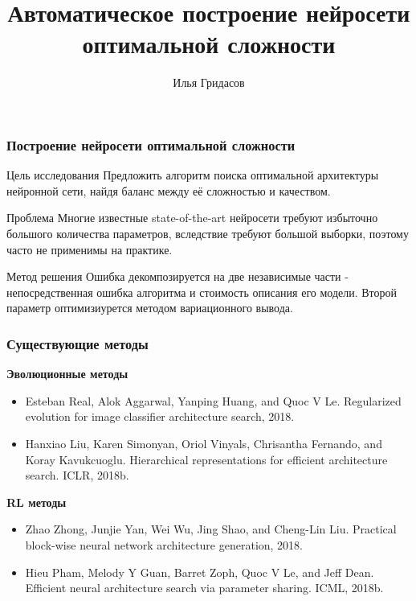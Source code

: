 \documentclass{beamer}
\title[\hbox to 56mm{Нейросеть оптимальной сложности  \hfill\insertframenumber\,/\,\inserttotalframenumber}]
{Автоматическое построение нейросети оптимальной сложности}
\author[И.\,И.~Гридасов]{Илья Гридасов}
\institute{Московский физико-технический институт}
\date{\footnotesize{
\par\emph{Курс:} Численные методы обучения по прецедентам
(практика, В. В. Стрижов), группа 694, весна 2019
\par\emph{консультанты:} О.\,Ю.~Бахтеев, В. \,В.~Стрижов
\date{qq}
}}
\begin{document}
\begin{frame}
\titlepage %
\end{frame}

\begin{frame}
\frametitle{Построение нейросети оптимальной сложности}
\begin{block}{Цель исследования}
Предложить алгоритм поиска оптимальной архитектуры нейронной сети, найдя баланс между её сложностью и качеством. 
\end{block}
\begin{block}{Проблема}
Многие известные state-of-the-art нейросети требуют избыточно большого количества параметров, вследствие требуют большой выборки, поэтому часто не применимы на практике.
\end{block}
\begin{block}{Метод решения}
Ошибка декомпозируется на две независимые части - непосредственная ошибка алгоритма и стоимость описания его модели. Второй параметр оптимизиурется методом вариационного вывода.
\end{block}

\end{frame}

\begin{frame}
\frametitle{Существующие методы}

\textbf{Эволюционные методы}

\begin{itemize}
  \item Esteban Real, Alok Aggarwal, Yanping Huang, and Quoc V Le. Regularized evolution for image classifier architecture search, 2018.
  \item Hanxiao Liu, Karen Simonyan, Oriol Vinyals, Chrisantha Fernando, and Koray Kavukcuoglu. Hierarchical representations for efficient architecture search. ICLR, 2018b.
\end{itemize}

\textbf{RL методы}

\begin{itemize}
  \item Zhao Zhong, Junjie Yan, Wei Wu, Jing Shao, and Cheng-Lin Liu. Practical block-wise neural network
architecture generation, 2018.
  \item Hieu Pham, Melody Y Guan, Barret Zoph, Quoc V Le, and Jeff Dean. Efficient neural architecture
search via parameter sharing. ICML, 2018b.
\end{itemize}

\end{frame}
\end{document}
